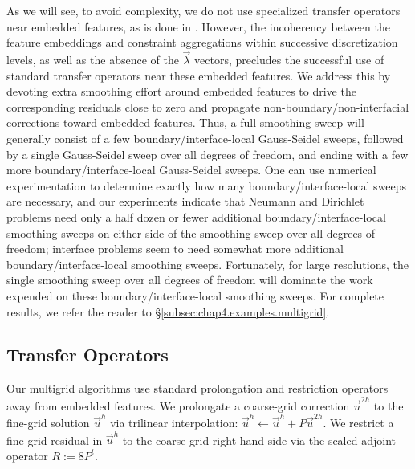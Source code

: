 As we will see, to avoid complexity, we do not use specialized transfer operators near embedded features, as is done in \cite{Adams.Loyce02, Adams.Loyce04, Adams.Loyce05, Chen08, Wan.Justin04}. However, the incoherency between the feature embeddings and constraint aggregations within successive discretization levels, as well as the absence of the $\vec{\lambda}$ vectors, precludes the successful use of standard transfer operators near these embedded features. We address this by devoting extra smoothing effort around embedded features to drive the corresponding residuals close to zero and propagate non-boundary/non-interfacial corrections toward embedded features. Thus, a full smoothing sweep will generally consist of a few boundary/interface-local Gauss-Seidel sweeps, followed by a single Gauss-Seidel sweep over all degrees of freedom, and ending with a few more boundary/interface-local Gauss-Seidel sweeps. One can use numerical experimentation to determine exactly how many boundary/interface-local sweeps are necessary, and our experiments indicate that Neumann and Dirichlet problems need only a half dozen or fewer additional boundary/interface-local smoothing sweeps on either side of the smoothing sweep over all degrees of freedom; interface problems seem to need somewhat more additional boundary/interface-local smoothing sweeps. Fortunately, for large resolutions, the single smoothing sweep over all degrees of freedom will dominate the work expended on these boundary/interface-local smoothing sweeps. For complete results, we refer the reader to \S\ref{subsec:chap4.examples.multigrid}.

\subsection{Transfer Operators} \label{subsec:chap4.multigrid.transferoperators}

Our multigrid algorithms use standard prolongation and restriction operators away from embedded features. We prolongate a coarse-grid correction $\vec{u}^{2h}$ to the fine-grid solution $\vec{u}^h$ via trilinear interpolation: $\vec{u}^h \leftarrow \vec{u}^h + P \vec{u}^{2h}$. We restrict a fine-grid residual in $\vec{u}^h$ to the coarse-grid right-hand side via the scaled adjoint operator $R := 8 P^t$.

